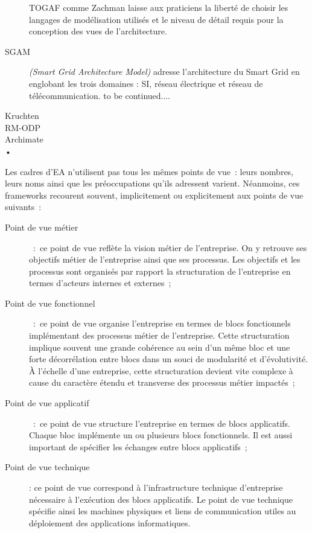 \begin{description}
TOGAF comme Zachman laisse aux praticiens la liberté de choisir les langages de modélisation utilisés et le niveau de détail requis pour la conception des vues de l'architecture. 

\item[SGAM] \textit{(Smart Grid Architecture Model)} \cite{uslar2012standardization} adresse l'architecture du Smart Grid en englobant les trois domaines : SI, réseau électrique et réseau de télécommunication.  to be continued....

\item[Kruchten]

\item[RM-ODP]

\item[Archimate]

\item[•]



\end{description}


Les cadres d'EA n'utilisent pas tous les mêmes points de vue~: leurs nombres, leurs noms ainsi que les préoccupations qu'ils adressent varient. Néanmoins, ces 
frameworks recourent souvent, implicitement ou explicitement aux points de vue suivants~:

\begin{description}

\item[Point de vue métier]~:~ce point de vue reflète la vision métier de l'entreprise. On y retrouve ses objectifs métier de l'entreprise ainsi que ses processus. Les objectifs et les processus sont organisés par rapport la structuration de l'entreprise en termes d'acteurs internes et externes~;

\item[Point de vue fonctionnel]~:~ce point de vue organise l'entreprise en termes  de blocs fonctionnels implémentant des processus métier de l'entreprise. Cette structuration implique souvent une grande cohérence au sein d'un même bloc et une forte décorrélation entre blocs dans un souci de modularité et d'évolutivité. À l'échelle d'une entreprise, cette structuration devient vite complexe à cause du caractère étendu et transverse des processus métier impactés~;

\item[Point de vue applicatif]~:~ce point de vue structure l'entreprise en termes de blocs applicatifs. Chaque bloc implémente un ou plusieurs blocs fonctionnels. Il est aussi important de spécifier les échanges entre blocs applicatifs~;

\item[Point de vue technique] : ce point de vue correspond à l'infrastructure technique d'entreprise nécessaire à l'exécution des blocs applicatifs. Le point de vue technique spécifie ainsi les machines physiques et liens de communication utiles au déploiement des applications informatiques. 
\end{description}

